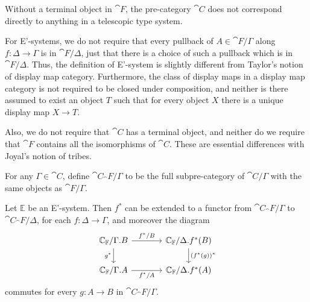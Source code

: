 \begin{rmk}
Without a terminal object in $\cat{F}$, the pre-category $\cat{C}$ does not correspond
directly to anything in a telescopic type system.
\end{rmk}

\begin{rmk}
For E'-systems, we do not require that every pullback of $A\in\cat{F}/\Gamma$ along $f:\Delta\to\Gamma$
is in $\cat{F}/\Delta$, just that there is a choice of such a pullback which is
in $\cat{F}/\Delta$. Thus, the definition of E'-system is slightly different from
Taylor's notion of display map category. Furthermore, the class of display maps in
a display map category is not required to be closed under composition, and neither
is there assumed to exist an object $T$ such that for every object $X$ there is a 
unique display map $X\to T$.
\end{rmk}

\begin{rmk}
Also, we do not require that $\cat{C}$ has a terminal object, and neither do
we require that $\cat{F}$ contains all the isomorphisms of $\cat{C}$. These are
essential differences with Joyal's notion of tribes.   
\end{rmk}

\begin{defn}
For any $\Gamma\in\cat{C}$, define $\cat{C}_\cat{F}/\Gamma$ to be the full
subpre-category of $\cat{C}/\Gamma$ with the same objects as $\cat{F}/\Gamma$. 
\end{defn}

\begin{lem}\label{lem:pb_selfdistributive}
Let $\mathbb{E}$ be an E'-system. Then $f^\ast$ can be extended to a functor from
$\cat{C}_\cat{F}/\Gamma$ to $\cat{C}_\cat{F}/\Delta$, for each $f:\Delta\to\Gamma$, and moreover the diagram
\begin{equation*}
\begin{tikzcd}[column sep=large]
\cat{C}_\cat{F}/\ctxext{\Gamma}{B} \arrow[r,"{f^\ast/B}"] \arrow[d,swap,"{g^\ast}"]
& \cat{C}_\cat{F}/\ctxext{\Delta}{f^\ast(B)} \arrow[d,"{(f^\ast(g))^\ast}"] \\
\cat{C}_\cat{F}/\ctxext{\Gamma}{A} \arrow[r,swap,"{f^\ast/A}"]
& \cat{C}_\cat{F}/\ctxext{\Delta}{f^\ast(A)}
\end{tikzcd}
\end{equation*}
commutes for every $g:A\to B$ in $\cat{C}_\cat{F}/\Gamma$.
\end{lem}

